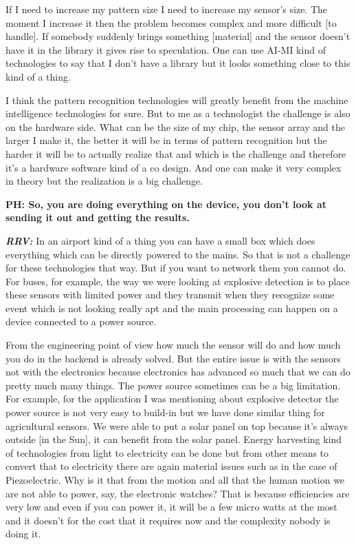 \begin{multicols}{2}
If I need to increase my pattern size I need to increase my sensor’s size. The moment I increase it then the problem becomes complex and more difficult [to handle]. If somebody suddenly brings something [material] and the sensor doesn’t have it in the library it gives rise to speculation. One can use AI-MI kind of technologies to say that I don’t have a library but it looks something close to this kind of a thing.

I think the pattern recognition technologies will greatly benefit from the machine intelligence technologies for sure. But to me as a technologist the challenge is also on the hardware side. What can be the size of my chip, the sensor array and the larger I make it, the better it will be in terms of pattern recognition but the harder it will be to actually realize that and which is the challenge and therefore it’s a hardware software kind of a co design. And one can make it very complex in theory but the realization is a big challenge.

\textbf{PH: So, you are doing everything on the device, you don’t look at sending it out and getting the results.}

\textbf{\textit{RRV:}} In an airport kind of a thing you can have a small box which does everything which can be directly powered to the mains. So that is not a challenge for these technologies that way. But if you want to network them you cannot do. For buses, for example, the way we were looking at explosive detection is to place these sensors with limited power and they transmit when they recognize some event which is not looking really apt and the main processing can happen on a device connected to a power source.

From the engineering point of view how much the sensor will do and how much you do in the backend is already solved. But the entire issue is with the sensors not with the electronics because electronics has advanced so much that we can do pretty much many things. The power source sometimes can be a big limitation. For example, for the application I was mentioning about explosive detector the power source is not very easy to build-in but we have done similar thing for agricultural sensors. We were able to put a solar panel on top because it’s always outside [in the Sun], it can benefit from the solar panel.  Energy harvesting kind of technologies from light to electricity can be done but from other means to convert that to electricity there are again material issues such as in the case of Piezoelectric. Why is it that from the motion and all that the human motion we are not able to power, say, the electronic watches? That is because efficiencies are very low and even if you can power it, it will be a few micro watts at the most and it doesn’t for the cost that it requires now and the complexity nobody is doing it.


\end{multicols}
